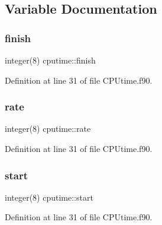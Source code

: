 \subsection{Variable Documentation}
\mbox{\label{namespacecputime_ad2d439f12d6051a89b5ba23d52aa3e4f}} 
\subsubsection{\texorpdfstring{finish}{finish}}
{\footnotesize\ttfamily integer(8) cputime\+::finish\hspace{0.3cm}{\ttfamily [private]}}



Definition at line 31 of file C\+P\+Utime.\+f90.

\mbox{\label{namespacecputime_a7648112eab2c70c19434f100a9599633}} 
\subsubsection{\texorpdfstring{rate}{rate}}
{\footnotesize\ttfamily integer(8) cputime\+::rate\hspace{0.3cm}{\ttfamily [private]}}



Definition at line 31 of file C\+P\+Utime.\+f90.

\mbox{\label{namespacecputime_a3c944d7fc4487f41daf6348bf28b1598}} 
\subsubsection{\texorpdfstring{start}{start}}
{\footnotesize\ttfamily integer(8) cputime\+::start\hspace{0.3cm}{\ttfamily [private]}}



Definition at line 31 of file C\+P\+Utime.\+f90.

